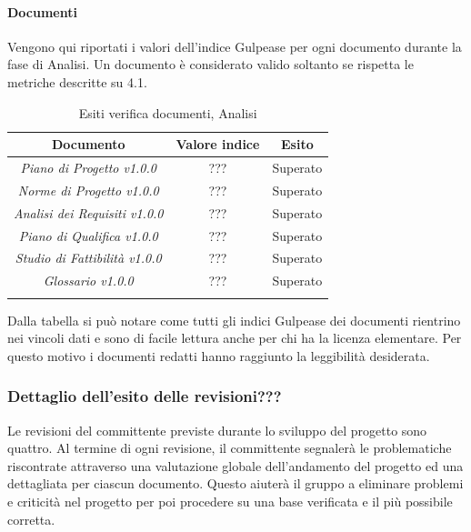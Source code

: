 \paragraph{Documenti} \Spazio
Vengono qui riportati i valori dell’indice Gulpease per ogni documento durante la fase
di Analisi. Un documento è considerato valido soltanto se rispetta le metriche descritte
su 4.1.
\begin{longtable}{|c|c|c|}
\hline
\textbf{Documento} & \textbf{Valore indice} & \textbf{Esito} \\
\hline
	\emph{Piano di Progetto v1.0.0} & {???} & {Superato}\\
\hline
	\emph{Norme di Progetto v1.0.0} & {???} & {Superato}\\
\hline
	\emph{Analisi dei Requisiti v1.0.0} & {???} & {Superato}\\
\hline
	\emph{Piano di Qualifica v1.0.0} & {???} & {Superato}\\
\hline
	\emph{Studio di Fattibilità v1.0.0} & {???} & {Superato}\\
\hline
	\emph{Glossario v1.0.0} & {???} & {Superato}\\
\hline
\caption[Esiti verifica documenti, Analisi]{Esiti verifica documenti, Analisi}
\label{tabella:verifica documenti}
\endhead
\end{longtable}
Dalla tabella si può notare come tutti gli indici Gulpease dei documenti rientrino nei vincoli dati e sono di facile lettura anche per chi ha la licenza elementare. Per questo motivo i documenti redatti hanno raggiunto la leggibilità desiderata.
\subsubsection{Dettaglio dell’esito delle revisioni???}
Le revisioni del committente previste durante lo sviluppo del progetto sono quattro.
Al termine di ogni revisione, il committente segnalerà le problematiche riscontrate attraverso una valutazione globale dell'andamento del progetto ed una dettagliata per ciascun documento. 
Questo aiuterà il gruppo a eliminare problemi e criticità nel progetto per poi procedere su una base verificata e il più possibile corretta.
\pagebreak